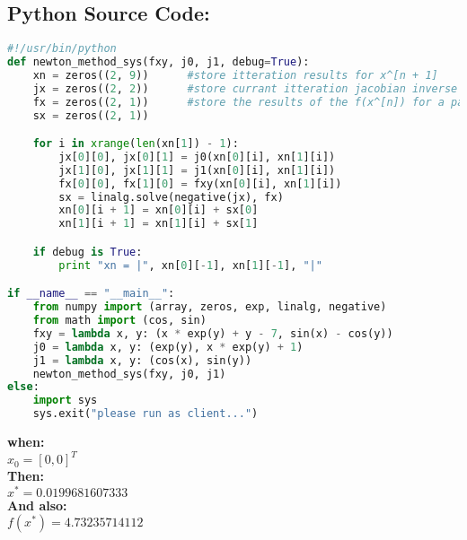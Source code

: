 \documentclass{article}
\begin{document}
\subsection*{Python Source Code: }
\begin{lstlisting}[language=Python]
#!/usr/bin/python
def newton_method_sys(fxy, j0, j1, debug=True):
    xn = zeros((2, 9))      #store itteration results for x^[n + 1]
    jx = zeros((2, 2))      #store currant itteration jacobian inverse
    fx = zeros((2, 1))      #store the results of the f(x^[n]) for a particular itteration
    sx = zeros((2, 1))

    for i in xrange(len(xn[1]) - 1):
        jx[0][0], jx[0][1] = j0(xn[0][i], xn[1][i])
        jx[1][0], jx[1][1] = j1(xn[0][i], xn[1][i])
        fx[0][0], fx[1][0] = fxy(xn[0][i], xn[1][i])
        sx = linalg.solve(negative(jx), fx)
        xn[0][i + 1] = xn[0][i] + sx[0]
        xn[1][i + 1] = xn[1][i] + sx[1]

    if debug is True:
        print "xn = |", xn[0][-1], xn[1][-1], "|"

if __name__ == "__main__":
    from numpy import (array, zeros, exp, linalg, negative)
    from math import (cos, sin)
    fxy = lambda x, y: (x * exp(y) + y - 7, sin(x) - cos(y))
    j0 = lambda x, y: (exp(y), x * exp(y) + 1)
    j1 = lambda x, y: (cos(x), sin(y))
    newton_method_sys(fxy, j0, j1)
else:
    import sys
    sys.exit("please run as client...")

\end{lstlisting}
  \textbf{when:\\}
  \textbf{$x_0 = [0, 0]^T$ \\ \textbf{Then:}\\  $x^* = 0.0199681607333$\\ \textbf{And also:}\\ $f(x^*) = 4.73235714112$}
\end{document}
